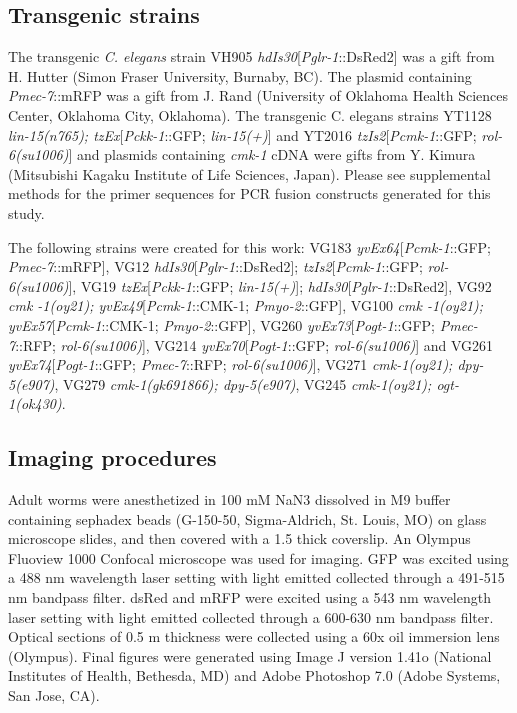 \documentclass[9pt,twocolumn,twoside]{gsajnl}
\begin{document}
\subsection{Transgenic strains} 

The transgenic \textit{C. elegans} strain VH905 \textit{hdIs30}[\textit{Pglr-1}::DsRed2] was a gift from H. Hutter (Simon Fraser University, Burnaby, BC). The plasmid containing \textit{Pmec-7}::mRFP was a gift from J. Rand (University of Oklahoma Health Sciences Center, Oklahoma City, Oklahoma). The transgenic C. elegans strains YT1128 \textit{lin-15(n765); tzEx}[\textit{Pckk-1}::GFP; \textit{lin-15(+)}] and YT2016 \textit{tzIs2}[\textit{Pcmk-1}::GFP; \textit{rol-6(su1006)}] and plasmids containing \textit{cmk-1} cDNA were gifts from Y. Kimura (Mitsubishi Kagaku Institute of Life Sciences, Japan). Please see supplemental methods for the primer sequences for PCR fusion constructs generated for this study.

The following strains were created for this work: VG183 \textit{yvEx64}[\textit{Pcmk-1}::GFP; \textit{Pmec-7}::mRFP], VG12 \textit{hdIs30}[\textit{Pglr-1}::DsRed2]; \textit{tzIs2}[\textit{Pcmk-1}::GFP; \textit{rol-6(su1006)}], VG19 \textit{tzEx}[\textit{Pckk-1}::GFP; \textit{lin-15(+)}]; \textit{hdIs30}[\textit{Pglr-1}::DsRed2], VG92 \textit{cmk -1(oy21); yvEx49}[\textit{Pcmk-1}::CMK-1; \textit{Pmyo-2}::GFP], VG100 \textit{cmk -1(oy21); yvEx57}[\textit{Pcmk-1}::CMK-1; \textit{Pmyo-2}::GFP], VG260 \textit{yvEx73}[\textit{Pogt-1}::GFP; 
\textit{Pmec-7}::RFP; \textit{rol-6(su1006)}], VG214 \textit{yvEx70}[\textit{Pogt-1}::GFP; \textit{rol-6(su1006)}] and VG261 \textit{yvEx74}[\textit{Pogt-1}::GFP; \textit{Pmec-7}::RFP; \textit{rol-6(su1006)}], VG271 \textit{cmk-1(oy21); dpy-5(e907)}, VG279 \textit{cmk-1(gk691866); dpy-5(e907)}, VG245 \textit{cmk-1(oy21); ogt-1(ok430)}.

\subsection{Imaging procedures} 

Adult worms were anesthetized in 100 mM NaN3 dissolved in M9 buffer containing sephadex beads (G-150-50, Sigma-Aldrich, St. Louis, MO) on glass microscope slides, and then covered with a 1.5 thick coverslip. An Olympus Fluoview 1000 Confocal microscope was used for imaging. GFP was excited using a 488 nm wavelength laser setting with light emitted collected through a 491-515 nm bandpass filter. dsRed and mRFP were excited using a 543 nm wavelength laser setting with light emitted collected through a 600-630 nm bandpass filter. Optical sections of 0.5 m thickness were collected using a 60x oil immersion lens (Olympus). Final figures were generated using Image J version 1.41o (National Institutes of Health, Bethesda, MD) and Adobe Photoshop 7.0 (Adobe Systems, San Jose, CA).
\end{document}
